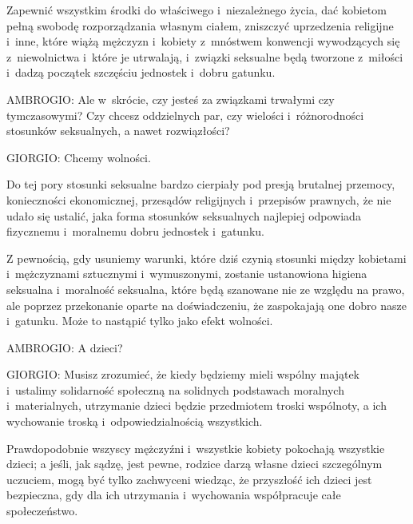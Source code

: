 \documentclass[oneside,polish,11pt,sfheadings]{mwbk}
\begin{document}
 
Zapewnić wszystkim środki do właściwego i~niezależnego życia, dać kobietom pełną swobodę rozporządzania własnym ciałem,
zniszczyć uprzedzenia religijne i~inne, które wiążą mężczyzn i~kobiety z~mnóstwem konwencji wywodzących się z~niewolnictwa i~które je utrwalają, i~związki seksualne będą tworzone z~miłości i~dadzą początek szczęściu jednostek i~dobru gatunku. 




 
\noindent AMBROGIO: Ale w~skrócie, czy jesteś za związkami trwałymi czy tymczasowymi? Czy chcesz oddzielnych par, czy wielości i~różnorodności stosunków seksualnych, a nawet rozwiązłości? 




 
\noindent GIORGIO: Chcemy wolności. 

 
Do tej pory stosunki seksualne bardzo cierpiały pod presją brutalnej przemocy, konieczności ekonomicznej, przesądów
religijnych i~przepisów prawnych, że nie udało się ustalić, jaka forma stosunków seksualnych najlepiej odpowiada
fizycznemu i~moralnemu dobru jednostek i~gatunku. 

 
Z pewnością, gdy usuniemy warunki, które dziś czynią stosunki między kobietami i~mężczyznami sztucznymi i~wymuszonymi,
zostanie ustanowiona higiena seksualna i~moralność seksualna, które będą szanowane nie ze względu na prawo, ale poprzez
przekonanie oparte na doświadczeniu, że zaspokajają one dobro nasze i~gatunku. Może to nastąpić tylko jako efekt
wolności. 




 
\noindent AMBROGIO: A dzieci? 




 
\noindent GIORGIO: Musisz zrozumieć, że kiedy będziemy mieli wspólny majątek i~ustalimy solidarność społeczną na solidnych
podstawach moralnych i~materialnych, utrzymanie dzieci będzie przedmiotem troski wspólnoty, a ich wychowanie troską i~odpowiedzialnością wszystkich. 

 
Prawdopodobnie wszyscy mężczyźni i~wszystkie kobiety pokochają wszystkie dzieci; a jeśli, jak sądzę, jest pewne, rodzice
darzą własne dzieci szczególnym uczuciem, mogą być tylko zachwyceni wiedząc, że przyszłość ich dzieci jest bezpieczna,
gdy dla ich utrzymania i~wychowania współpracuje całe społeczeństwo. 
\end{document}

